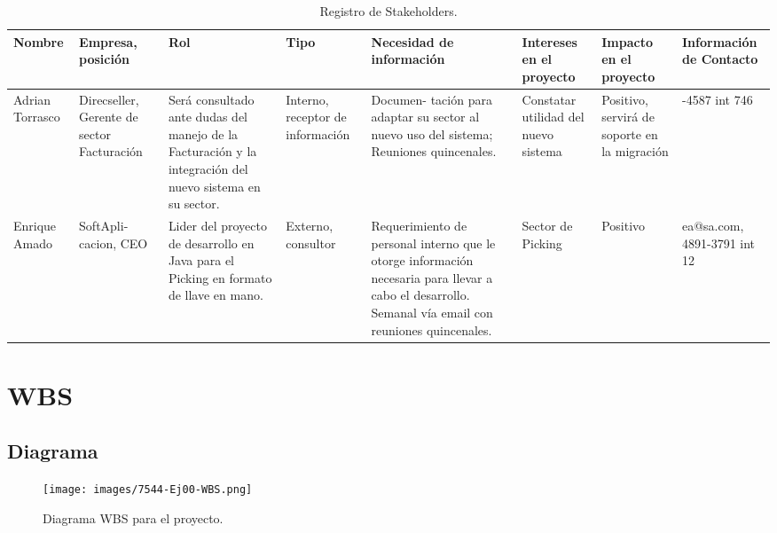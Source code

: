 \documentclass{article}
\begin{document}
	\begin{table}[!hbt]
		\begin{center}
		\begin{tabular}{| >{\raggedright}m{1.8cm} | >{\centering}m{1.5cm} | >{\raggedright}m{2cm} | >{\raggedright}m{1.5cm} | >{\centering}m{2.2cm} | >{\centering}m{1.8cm} | >{\centering}m{1.8cm} | >{\centering}m{2cm} |}
			\hline
			\rowcolor[gray]{0.9}\textbf{Nombre} & \textbf{Empresa, posición} & \textbf{Rol} & \textbf{Tipo} & \textbf{Necesidad de información} & \textbf{Intereses en el proyecto} & \textbf{Impacto en el proyecto} & \textbf{Información de Contacto} \tabularnewline
			\hline
			Adrian Torrasco & Direcseller, Gerente de sector Facturación & Será consultado ante dudas del manejo de la Facturación y la integración del nuevo sistema en su sector. & Interno, receptor de información & Documen- tación para adaptar su sector al nuevo uso del sistema; Reuniones quincenales. & Constatar utilidad del nuevo sistema & Positivo, servirá de soporte en la migración & 4012-4587 int 746 \tabularnewline
			\hline
			Enrique Amado & SoftApli- cacion, CEO & Lider del proyecto de desarrollo en Java para el Picking en formato de llave en mano. & Externo, consultor & Requerimiento de personal interno que le otorge información necesaria para llevar a cabo el desarrollo. Semanal vía email con reuniones quincenales. & Sector de Picking & Positivo & ea@sa.com, 4891-3791 int 12 \tabularnewline
			\hline
		\end{tabular}
		\caption{Registro de Stakeholders.}
		\end{center}
	\end{table}


\bigskip


\newpage


%
%
\section{WBS}


\subsection{Diagrama}


\begin{figure}[h]
	\centering
	\texttt{[image: images/7544-Ej00-WBS.png]}
	\medskip
	\caption{Diagrama WBS para el proyecto.}
\end{figure}
\bigskip\bigskip\bigskip\bigskip
\end{document}
